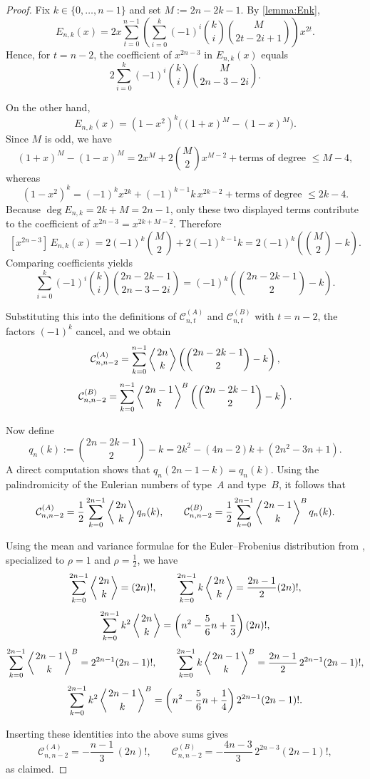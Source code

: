 \documentclass[11pt,twoside]{article}
\numberwithin{equation}{section}
\begin{document}
\begin{proof}
Fix \(k\in\{0,\dots,n-1\}\) and set \(M:=2n-2k-1\). By \cref{lemma:Enk},
\[
E_{n,k}(x)
=
2x\sum_{t=0}^{n-1}
\left(
\sum_{i=0}^{k}(-1)^i\binom{k}{i}\binom{M}{2t-2i+1}
\right)x^{2t}.
\]
Hence, for \(t=n-2\), the coefficient of \(x^{2n-3}\) in \(E_{n,k}(x)\) equals
\[
2\sum_{i=0}^{k}(-1)^i\binom{k}{i}\binom{M}{2n-3-2i}.
\]

On the other hand,
\[
E_{n,k}(x)=(1-x^2)^k\bigl((1+x)^M-(1-x)^M\bigr).
\]
Since \(M\) is odd, we have
\[
(1+x)^M-(1-x)^M
=
2x^M+2\binom{M}{2}x^{M-2}+\text{terms of degree }\le M-4,
\]
whereas
\[
(1-x^2)^k
=
(-1)^k x^{2k}+(-1)^{k-1}k\,x^{2k-2}
+\text{terms of degree }\le 2k-4.
\]
Because \(\deg E_{n,k}=2k+M=2n-1\), only these two displayed terms contribute to
the coefficient of \(x^{2n-3}=x^{2k+M-2}\). Therefore
\[
[x^{2n-3}]\,E_{n,k}(x)
=
2(-1)^k\binom{M}{2}+2(-1)^{k-1}k
=
2(-1)^k\left(\binom{M}{2}-k\right).
\]
Comparing coefficients yields
\[
\sum_{i=0}^{k}(-1)^i\binom{k}{i}\binom{2n-2k-1}{2n-3-2i}
=
(-1)^k\left(\binom{2n-2k-1}{2}-k\right).
\]

Substituting this into the definitions of \(\mathcal C^{(A)}_{n,t}\) and
\(\mathcal C^{(B)}_{n,t}\) with \(t=n-2\), the factors \((-1)^k\) cancel, and we obtain
\[
\mathcal C^{(A)}_{n,n-2}
=
\sum_{k=0}^{n-1}\left\langle{2n\atop k}\right\rangle
\left(\binom{2n-2k-1}{2}-k\right),
\]
\[
\mathcal C^{(B)}_{n,n-2}
=
\sum_{k=0}^{n-1}\left\langle{2n-1\atop k}\right\rangle^{B}
\left(\binom{2n-2k-1}{2}-k\right).
\]

Now define
\[
q_n(k):=\binom{2n-2k-1}{2}-k
=
2k^2-(4n-2)k+(2n^2-3n+1).
\]
A direct computation shows that \(q_n(2n-1-k)=q_n(k)\). Using the palindromicity
of the Eulerian numbers of type~\(A\) and type~\(B\), it follows that
\[
\mathcal C^{(A)}_{n,n-2}
=
\frac12\sum_{k=0}^{2n-1}\left\langle{2n\atop k}\right\rangle q_n(k),
\qquad
\mathcal C^{(B)}_{n,n-2}
=
\frac12\sum_{k=0}^{2n-1}\left\langle{2n-1\atop k}\right\rangle^{B} q_n(k).
\]

Using the mean and variance formulae for the Euler--Frobenius distribution from
\cite[Theorem~5.3]{Janson2013EulerFrobenius}, specialized to \(\rho=1\) and
\(\rho=\tfrac12\), we have
\[
\sum_{k=0}^{2n-1}\left\langle{2n\atop k}\right\rangle=(2n)!,
\qquad
\sum_{k=0}^{2n-1}k\left\langle{2n\atop k}\right\rangle=\frac{2n-1}{2}(2n)!,
\]
\[
\sum_{k=0}^{2n-1}k^2\left\langle{2n\atop k}\right\rangle
=
\left(n^2-\frac56n+\frac13\right)(2n)!,
\]
\[
\sum_{k=0}^{2n-1}\left\langle{2n-1\atop k}\right\rangle^{B}
=
2^{2n-1}(2n-1)!,
\qquad
\sum_{k=0}^{2n-1}k\left\langle{2n-1\atop k}\right\rangle^{B}
=
\frac{2n-1}{2}\,2^{2n-1}(2n-1)!,
\]
\[
\sum_{k=0}^{2n-1}k^2\left\langle{2n-1\atop k}\right\rangle^{B}
=
\left(n^2-\frac56n+\frac14\right)2^{2n-1}(2n-1)!.
\]

Inserting these identities into the above sums gives
\[
\mathcal C^{(A)}_{n,n-2}
=
-\frac{n-1}{3}\,(2n)!,
\qquad
\mathcal C^{(B)}_{n,n-2}
=
-\frac{4n-3}{3}\,2^{2n-3}(2n-1)!,
\]
as claimed.
\end{proof}
\end{document}
